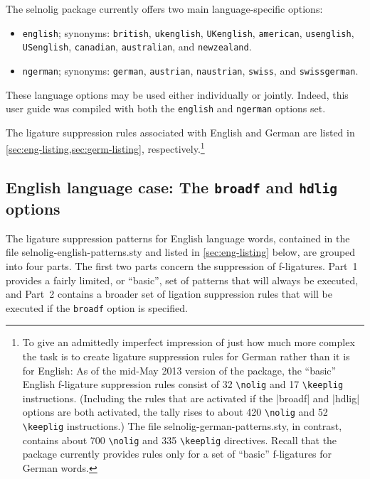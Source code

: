 \documentclass[11pt]{article}
\newcommand{\pkg}[1]{\textsf{#1}}
\newcommand{\opt}[1]{\texttt{#1}}
\newcommand{\cmmd}[1]{\texttt{\textbackslash #1}}
\begin{document}
The \pkg{selnolig} package currently offers two main language-specific options: 
\begin{itemize}
\item \opt{english}; synonyms: \opt{british}, \opt{ukenglish}, \opt{UKenglish}, \opt{amer\-ican}, \opt{usenglish}, \opt{USenglish}, \opt{cana\-dian}, \opt{australian}, and \opt{new\-zealand}.
\item \opt{ngerman}; synonyms: \opt{german}, \opt{austrian}, \opt{naustrian}, \opt{swiss}, and \opt{swiss\-german}.
\end{itemize}
These language options may be used either individually or jointly. Indeed, this user guide was compiled with both the \opt{english} and \opt{ngerman} options set.

The ligature suppression rules associated with English and German are listed in \cref{sec:eng-listing,sec:germ-listing}, respectively.\footnote{To give an admittedly imperfect impression of just how much more complex the task is to create ligature suppression rules for German rather than it is for English: As of the mid-May 2013 version of the package, the \enquote{basic} English f-ligature suppression rules consist of 32 \cmmd{nolig} and 17 \cmmd{keeplig} instructions. (Including the rules that are activated if the |broadf| and |hdlig| options are both activated, the tally rises to about 420 \cmmd{nolig} and 52 \cmmd{keeplig} instructions.) The file \pkg{selnolig-german-patterns.sty}, in contrast, contains about 700 \cmmd{nolig} and 335 \cmmd{keeplig} directives. Recall that the package currently provides rules only for a set of \enquote{basic} f-ligatures for German words.}



\subsection[English language case: The broadf and hdlig options]{English language case: The \opt{broadf} and \opt{hdlig} options} \label{sec:eng-opt}

The ligature suppression patterns for English language words, contained in the file \pkg{selnolig-english-patterns.sty} and listed in \cref{sec:eng-listing} below, are grouped into four parts. The first two parts concern the suppression of f-ligatures. Part~1 provides a fairly limited, or \enquote{basic}, set of patterns that will always be executed, and Part~2 contains a broader set of ligation suppression rules that will be executed if the \opt{broadf} option is specified. 
\end{document}
